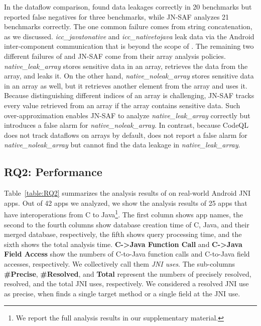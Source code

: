 In the dataflow comparison, \ours found data leakages correctly in 20
benchmarks but reported false negatives for three benchmarks, while JN-SAF
analyzes 21 benchmarks correctly. 
The one common failure comes from string concatenation, as we discussed.
{\it icc\_javatonative} and {\it icc\_nativetojava} leak data via the Android
inter-component communication that is beyond the scope of \ours.
The remaining two different failures of \ours and JN-SAF come from their array analysis policies.
{\it native\_leak\_array} stores sensitive data in an array, retrieves the data from the array,
and leaks it.  On the other hand, {\it native\_noleak\_array} stores sensitive
data in an array as well, but it retrieves another element from the array and uses it.
Because distinguishing different indices of an array is challenging, JN-SAF
tracks every value retrieved from an array if the array contains sensitive data.
Such over-approximation enables JN-SAF to analyze {\it
native\_leak\_array} correctly but introduces a false alarm for {\it
native\_noleak\_array}.  In contrast, because CodeQL does not
track dataflows on arrays by default, \ours does not report
a false alarm for {\it native\_noleak\_array} but cannot find the data leakage in {\it
native\_leak\_array}.


\subsection{RQ2: Performance}
Table~\ref{table:RQ2} summarizes the analysis results of \ours on real-world Android JNI apps.
Out of 42 apps we analyzed, we show the analysis
results of 25 apps that have interoperations from C to Java\footnote{We
report the full analysis results in our supplementary material.}.
The first column shows app names, the second to the fourth columns show database
creation time of C, Java, and their merged database, respectively, the fifth
shows query processing time, and the sixth shows the total analysis time.
{\bf C->Java Function Call} and {\bf C->Java Field Access}
show the numbers of C-to-Java function calls and
C-to-Java field accesses, respectively. We collectively call them
\emph{JNI uses}.
The sub-columns {\bf \#Precise}, {\bf \#Resolved}, and {\bf Total}
represent the numbers of precisely resolved, 
resolved, and the total JNI uses, respectively.
We considered a resolved JNI use as precise, when \ours finds a single target method
or a single field at the JNI use.


